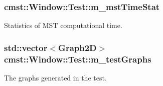 \subsubsection[{\texorpdfstring{m\+\_\+mst\+Time\+Stat}{m_mstTimeStat}}]{ cmst\+::\+Window\+::\+Test\+::m\+\_\+mst\+Time\+Stat}\hypertarget{structcmst_1_1_window_1_1_test_a103594f227a761c33c06b8dd68713c18}{}\label{structcmst_1_1_window_1_1_test_a103594f227a761c33c06b8dd68713c18}


Statistics of M\+ST computational time. 

\subsubsection[{\texorpdfstring{m\+\_\+test\+Graphs}{m_testGraphs}}]{\setlength{\rightskip}{0pt plus 5cm}std\+::vector$<${\bf Graph2D}$>$ cmst\+::\+Window\+::\+Test\+::m\+\_\+test\+Graphs}\hypertarget{structcmst_1_1_window_1_1_test_a42f44814c524399a3c1f547a64218c1a}{}\label{structcmst_1_1_window_1_1_test_a42f44814c524399a3c1f547a64218c1a}


The graphs generated in the test. 


